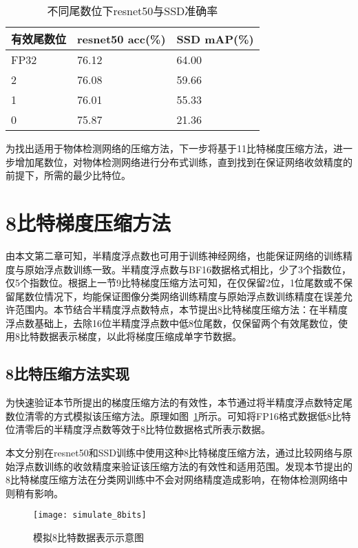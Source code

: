 \begin{table}[htb]
\centering
\noindent\begin{minipage}{0.6\textwidth}
\centering
\caption{不同尾数位下resnet50与SSD准确率}
\label{tab:simulate_11_10_9bits_acc}
\begin{tabular}{p{2cm}p{2.5cm}p{2.5cm}}
\toprule[1.5pt]
有效尾数位 & resnet50 acc(\%) & SSD mAP(\%) \\\midrule[1pt]
FP32 & 76.12 & 64.00 \\
2 & 76.08 & 59.66 \\
1 & 76.01 & 55.33 \\
0 & 75.87 & 21.36 \\
\midrule[1pt]
\end{tabular}
\end{minipage}
\end{table}
为找出适用于物体检测网络的压缩方法，下一步将基于11比特梯度压缩方法，进一步增加尾数位，对物体检测网络进行分布式训练，直到找到在保证网络收敛精度的前提下，所需的最少比特位。

\section{8比特梯度压缩方法}
由本文第二章可知，半精度浮点数也可用于训练神经网络，也能保证网络的训练精度与原始浮点数训练一致。半精度浮点数与BF16数据格式相比，少了3个指数位，仅5个指数位。根据上一节9比特梯度压缩方法可知，在仅保留2位，1位尾数或不保留尾数位情况下，均能保证图像分类网络训练精度与原始浮点数训练精度在误差允许范围内。本节结合半精度浮点数特点，本节提出8比特梯度压缩方法：在半精度浮点数基础上，去除16位半精度浮点数中低8位尾数，仅保留两个有效尾数位，使用8比特数据表示梯度，以此将梯度压缩成单字节数据。
\subsection{8比特压缩方法实现}
为快速验证本节所提出的梯度压缩方法的有效性，本节通过将半精度浮点数特定尾数位清零的方式模拟该压缩方法。原理如图~\ref{fig:simulate_8bits}所示。可知将FP16格式数据低8比特位清零后的半精度浮点数等效于8比特位数据格式所表示数据。

本文分别在resnet50和SSD训练中使用这种8比特梯度压缩方法，通过比较网络与原始浮点数训练的收敛精度来验证该压缩方法的有效性和适用范围。发现本节提出的8比特梯度压缩方法在分类网训练中不会对网络精度造成影响，在物体检测网络中则稍有影响。
\begin{figure}[htp]
\centering
\texttt{[image: simulate\_8bits]}
\caption{模拟8比特数据表示示意图}
\label{fig:simulate_8bits}
\end{figure}

